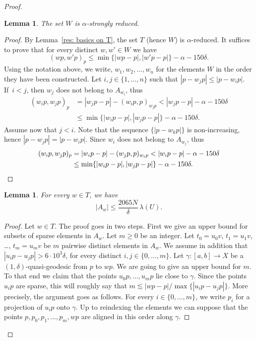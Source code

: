 \documentclass[11pt]{article}
\theoremstyle{plain}
\newtheorem{lem}[thm]{Lemma}
\theoremstyle{definition}
\begin{document}
\begin{proof}
\begin{lem}\label{L: construction of sub-semi-group 4}
The set $W$ is $\alpha$-strongly reduced.
\end{lem}

\begin{proof}
By Lemma~\ref{res: basics on T}, the set $T$ (hence $W$) is $\alpha$-reduced.
It suffices to prove that for every distinct $w,w' \in W$ we have
\begin{equation*}
(wp,w'p)_p \leq \min \{ |wp - p|, |w'p-p|\} - \alpha - 150\delta.
\end{equation*}
Using the notation above, we write, $w_1, w_2, \dots, w_n$ for the elements $W$ in the order they have been constructed.
Let $i,j \in \{1, \dots, n\}$ such that $|p - w_jp| \leq |p - w_ip|$.
If~$i < j$, then $w_j$ does not belong to $A_{w_i}$, thus
\begin{align*}
(w_ip, w_jp)_p
& = |w_jp-p| - (w_ip, p)_{w_jp} < |w_jp-p| - \alpha - 150\delta \\
& \leq \min \{ |w_ip - p|, |w_jp-p|\} - \alpha - 150\delta.
\end{align*}
Assume now that $j < i$.
Note that the sequence $\{|p - w_kp|\}$ is non-increasing, hence $|p - w_jp| = |p -w_ip|$.
Since $w_i$ does not belong to $A_{w_j}$, thus
\begin{align*}
(w_ip, w_jp)_p
& = |w_ip-p| - (w_jp, p)_{w_ip}
< |w_ip-p| - \alpha - 150\delta \\
& \leq \min \{ |w_ip - p|, |w_jp-p|\} - \alpha - 150\delta. \qedhere
\end{align*}
\end{proof}

\begin{lem}\label{L: construction of sub-semi-group 3}
For every $w \in T$, we have
\begin{equation*}
|A_w| \leq \frac{2065N}{\delta}\, \lambda(U).
\end{equation*}
\end{lem}

\begin{proof}
Let $w \in T$.
The proof goes in two steps.
First we give an upper bound for subsets of sparse elements in $A_w$.
Let $m \geq 0$ be an integer.
Let $t_0 = u_0v$, $t_1 = u_1v$, \dots, $t_m = u_mv$ be $m$ pairwise distinct elements in $A_w$.
We assume in addition that $|u_ip - u_jp| > 6\cdot 10^3\delta$, for every distinct $i,j \in \{0, \dots,m\}$.
Let $\gamma \colon [a,b] \to X$ be a $(1, \delta)$-quasi-geodesic from $p$ to $wp$.
We are going to give an upper bound for $m$.
To that end we claim that the points $u_0p, \dots, u_mp$ lie close to $\gamma$.
Since the points $u_ip$ are sparse, this will roughly say that $m \lesssim |wp-p| / \max\{ |u_ip - u_jp|\}$.
More precisely, the argument goes as follows.
For every $i \in \{0, \dots, m\}$, we write $p_i$ for a projection of $u_ip$ onto $\gamma$.
Up to reindexing the elements we can suppose that the points $p, p_0, p_1, \dots, p_m, wp$ are aligned in this order along $\gamma$.


\end{proof}
\end{proof}
\end{document}
